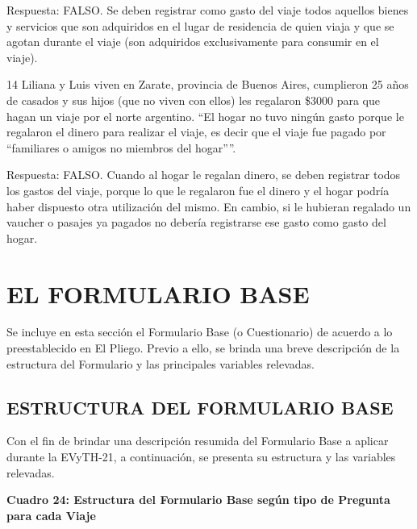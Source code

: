 \documentclass[
  openany]{book}
\begin{document}
Respuesta: FALSO. Se deben registrar como gasto del viaje todos aquellos bienes y servicios que son adquiridos en el lugar de residencia de quien viaja y que se agotan durante el viaje (son adquiridos exclusivamente para consumir en el viaje).

14 Liliana y Luis viven en Zarate, provincia de Buenos Aires, cumplieron 25 años de casados y sus hijos (que no viven con ellos) les regalaron \$3000 para que hagan un viaje por el norte argentino.
``El hogar no tuvo ningún gasto porque le regalaron el dinero para realizar el viaje, es decir que el viaje fue pagado por ``familiares o amigos no miembros del hogar''''.

Respuesta: FALSO. Cuando al hogar le regalan dinero, se deben registrar todos los gastos del viaje, porque lo que le regalaron fue el dinero y el hogar podría haber dispuesto otra utilización del mismo. En cambio, si le hubieran regalado un vaucher o pasajes ya pagados no debería registrarse ese gasto como gasto del hogar.

\hypertarget{el-formulario-base}{%
\section{\texorpdfstring{\textbf{EL FORMULARIO BASE}}{EL FORMULARIO BASE}}\label{el-formulario-base}}

Se incluye en esta sección el Formulario Base (o Cuestionario) de acuerdo a lo preestablecido en El Pliego. Previo a ello, se brinda una breve descripción de la estructura del Formulario y las principales variables relevadas.

\hypertarget{estructura-del-formulario-base}{%
\subsection{\texorpdfstring{\textbf{ESTRUCTURA DEL FORMULARIO BASE}}{ESTRUCTURA DEL FORMULARIO BASE}}\label{estructura-del-formulario-base}}

Con el fin de brindar una descripción resumida del Formulario Base a aplicar durante la EVyTH-21, a continuación, se presenta su estructura y las variables relevadas.

\textbf{Cuadro 24: Estructura del Formulario Base según tipo de Pregunta para cada Viaje}
\end{document}

